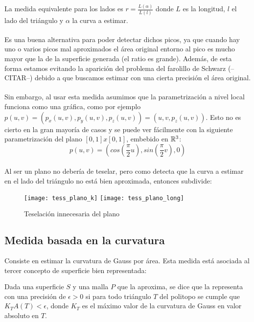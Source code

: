 	La medida equivalente para los lados es $r=\frac{L(\alpha)} {L(l)}$ donde $L$ es la longitud, $l$ el lado del triángulo y $\alpha$ la curva a estimar.\\
	\\Es una buena alternativa para poder detectar dichos picos, ya que cuando hay uno o varios picos mal aproximados el área original entorno al pico es mucho mayor que la de la superficie generada (el ratio es grande). Además, de esta forma estamos evitando la aparición del problema del farolillo de Schwarz (--CITAR--) debido a que buscamos estimar con una cierta precisión el área original.\\
	\\Sin embargo, al usar esta medida asumimos que la parametrización a nivel local funciona como una gráfica, como por ejemplo $p(u,v)=(p_x(u,v),p_y(u,v),p_z(u,v)) = (u,v,p_z(u,v))$. Esto no es cierto en la gran mayoría de casos y se puede ver fácilmente con la siguiente parametrización del plano $[0,1]x[0,1]$, embebido en $\mathbb{R}^3$:
	$$p(u,v)=(cos(\frac{\pi}{2} u), sin(\frac{\pi}{2} v), 0 )$$
	\\Al ser un plano no debería de teselar, pero como detecta que la curva a estimar en el lado del triángulo no está bien aproximada, entonces subdivide:
	\begin{figure}[h]
  		\centering
  		\texttt{[image: tess\_plano\_k]}
  		\texttt{[image: tess\_plano\_long]}
  		\caption{Teselación innecesaria del plano}
  		\label{fig:plano_tess}
	\end{figure}
	
	\subsection*{Medida basada en la curvatura}
	Consiste en estimar la curvatura de Gauss por área. Esta medida está asociada al tercer concepto de superficie bien representada:
	\begin{definicion}
		Dada una superficie $S$ y una malla $P$ que la aproxima, se dice que la representa con una precisión de $\epsilon > 0$ si para todo triángulo $T$ del politopo se cumple que $K_T A(T) < \epsilon$, donde $K_T$ es el máximo valor de la curvatura de Gauss en valor absoluto en $T$.
	\end{definicion}
	
